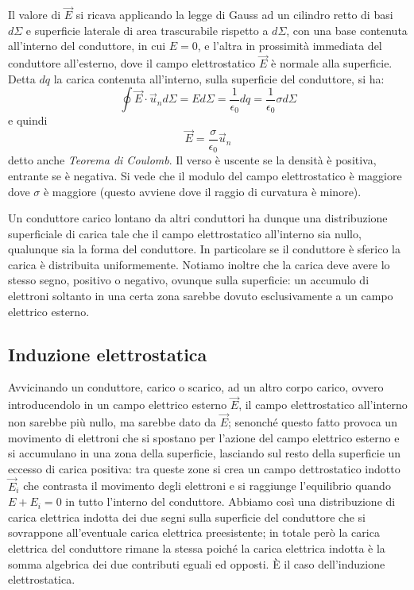 \documentclass[class=book, crop=false, oneside, 12pt]{standalone}
\begin{document}
Il valore di \(\overrightarrow{E}\) si ricava applicando la legge di Gauss ad un cilindro retto di basi \(d \Sigma\) e superficie laterale di area trascurabile rispetto a \(d \Sigma\), con una base contenuta all'interno del conduttore, in cui \(E = 0\), e l'altra in prossimità immediata del conduttore all'esterno, dove il campo elettrostatico \(\overrightarrow{E}\) è normale alla superficie. 
Detta \(dq\) la carica contenuta all'interno, sulla superficie del conduttore, si ha:
\begin{equation*}
    \oint \overrightarrow{E} \cdot \overrightarrow{u}_n d \Sigma = E d \Sigma = \frac{1}{\epsilon_0} d q = \frac{1}{\epsilon_0} \sigma d \Sigma
\end{equation*}
e quindi
\begin{equation} \label{teorema_coulomb}
    \overrightarrow{E} = \frac{\sigma}{\epsilon_0}\overrightarrow{u}_n
\end{equation}
detto anche \emph{Teorema di Coulomb}. 
Il verso è uscente se la densità è positiva, entrante se è negativa. 
Si vede che il modulo del campo elettrostatico è maggiore dove \(\sigma\) è maggiore (questo avviene dove il raggio di curvatura è minore).

Un conduttore carico lontano da altri conduttori ha dunque una distribuzione superficiale di carica tale che il campo elettrostatico all'interno sia nullo, qualunque sia la forma del conduttore. 
In particolare se il conduttore è sferico la carica è distribuita uniformemente.
Notiamo inoltre che la carica deve avere lo stesso segno, positivo o negativo, ovunque sulla superficie: un accumulo di elettroni soltanto in una certa zona sarebbe dovuto esclusivamente a un campo elettrico esterno.

\subsection{Induzione elettrostatica}

Avvicinando un conduttore, carico o scarico, ad un altro corpo carico, ovvero introducendolo in un campo elettrico esterno \(\overrightarrow{E}\), il campo elettrostatico all'interno non sarebbe più nullo, ma sarebbe dato da \(\overrightarrow{E}\); senonché questo fatto provoca un movimento di elettroni che si spostano per l'azione del campo elettrico esterno e si accumulano in una zona della superficie, lasciando sul resto della superficie un eccesso di carica positiva: 
tra queste zone si crea un campo dettrostatico indotto \(\overrightarrow{E}_i\) che contrasta il movimento degli elettroni e si raggiunge l'equilibrio quando \(E + E_i = 0\) in tutto l'interno del conduttore.
Abbiamo così una distribuzione di carica elettrica indotta dei due segni sulla superficie del conduttore che si sovrappone all'eventuale carica elettrica preesistente; in totale però la carica elettrica del conduttore rimane la stessa poiché la carica elettrica indotta è la somma algebrica dei due contributi eguali ed opposti.
È il caso dell'induzione elettrostatica.
\end{document}

